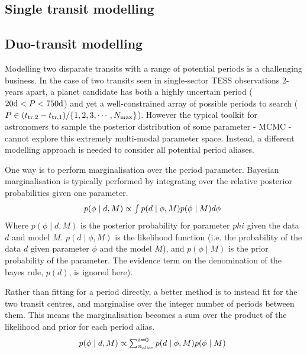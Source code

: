 \documentclass{article}
\begin{document}
\subsection{Single transit modelling}



\subsection{Duo-transit modelling}
Modelling two disparate transits with a range of potential periods is a challenging business.
In the case of two transits seen in single-sector TESS observations 2-years apart, a planet candidate has both a highly uncertain period ($20{\rm d}< P <750{\rm d}$) and yet a well-constrained array of possible periods to search ($P \in (t_{{\rm tr},2}-t_{{\rm tr},1})/\{1,2,3, \cdots, N_{\rm max}\}$).
However the typical toolkit for astronomers to sample the posterior distribution of some parameter - MCMC - cannot explore this extremely multi-modal parameter space.
Instead, a different modelling approach is needed to consider all potential period aliases.

One way is to perform marginalisation over the period parameter.
Bayesian marginalisation is typically performed by integrating over the relative posterior probabilities given one parameter.
\begin{equation}
$$ p(\phi \mid d, M) \propto \int p(d \mid \phi, M) p (\phi \mid M) d\phi \ $$
\end{equation}
Where $p(\phi \mid d, M)$ is the posterior probability for parameter $phi$ given the data $d$ and model $M$. $p(d \mid \phi, M)$ is the likelihood function (i.e. the probability of the data $d$ given parameter $\phi$ and the model $M$), and $p (\phi \mid M)$ is the prior probability of the parameter.
The evidence term on the denomination of the bayes rule, $p(d)$, is ignored here).

Rather than fitting for a period directly, a better method is to instead fit for the two transit centres, and marginalise over the integer number of periods between them.
This means the marginalisation becomes a sum over the product of the likelihood and prior for each period alias.
\begin{equation}
$$ p(\phi \mid d, M) \propto \sum^{i=0}_{n_{\rm alias}} p(d \mid \phi, M) p (\phi \mid M) \; $$
\end{equation}
\end{document}

